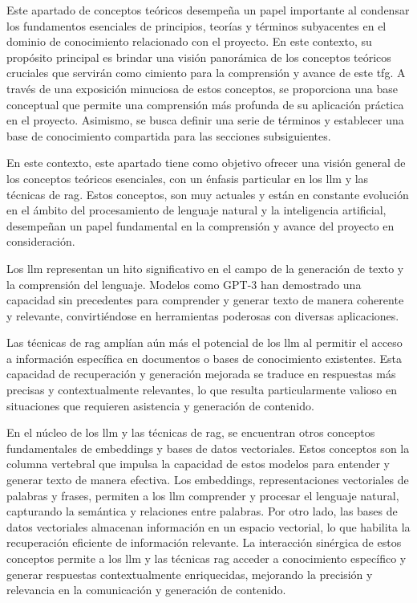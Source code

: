 
Este apartado de conceptos teóricos desempeña un papel importante al condensar los fundamentos esenciales de principios, teorías y términos subyacentes en el dominio de conocimiento relacionado con el proyecto. En este contexto, su propósito principal es brindar una visión panorámica de los conceptos teóricos cruciales que servirán como cimiento para la comprensión y avance de este \acrlong{tfg}. A través de una exposición minuciosa de estos conceptos, se proporciona una base conceptual que permite una comprensión más profunda de su aplicación práctica en el proyecto. Asimismo, se busca definir una serie de términos y establecer una base de conocimiento compartida para las secciones subsiguientes.

En este contexto, este apartado tiene como objetivo ofrecer una visión general de los conceptos teóricos esenciales, con un énfasis particular en los \acrfull{llm} y las técnicas de \acrfull{rag}. Estos conceptos, son muy actuales y están en constante evolución en el ámbito del procesamiento de lenguaje natural y la inteligencia artificial, desempeñan un papel fundamental en la comprensión y avance del proyecto en consideración.

Los \acrshort{llm} representan un hito significativo en el campo de la generación de texto y la comprensión del lenguaje. Modelos como GPT-3 han demostrado una capacidad sin precedentes para comprender y generar texto de manera coherente y relevante, convirtiéndose en herramientas poderosas con diversas aplicaciones.

Las técnicas de \acrshort{rag} amplían aún más el potencial de los \acrshort{llm} al permitir el acceso a información específica en documentos o bases de conocimiento existentes. Esta capacidad de recuperación y generación mejorada se traduce en respuestas más precisas y contextualmente relevantes, lo que resulta particularmente valioso en situaciones que requieren asistencia y generación de contenido.

En el núcleo de los \acrshort{llm} y las técnicas de \acrshort{rag}, se encuentran otros conceptos fundamentales de embeddings y bases de datos vectoriales. Estos conceptos son la columna vertebral que impulsa la capacidad de estos modelos para entender y generar texto de manera efectiva. Los embeddings, representaciones vectoriales de palabras y frases, permiten a los \acrshort{llm} comprender y procesar el lenguaje natural, capturando la semántica y relaciones entre palabras. Por otro lado, las bases de datos vectoriales almacenan información en un espacio vectorial, lo que habilita la recuperación eficiente de información relevante. La interacción sinérgica de estos conceptos permite a los \acrshort{llm} y las técnicas \acrshort{rag} acceder a conocimiento específico y generar respuestas contextualmente enriquecidas, mejorando la precisión y relevancia en la comunicación y generación de contenido.

